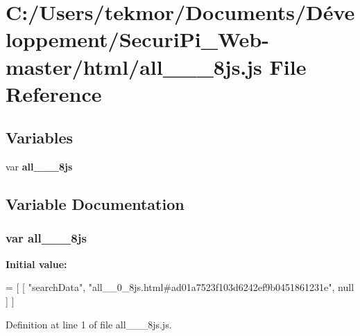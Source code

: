 \section{C\+:/\+Users/tekmor/\+Documents/\+Développement/\+Securi\+Pi\+\_\+\+Web-\/master/html/all\+\_\+\+\_\+\_\+8js.js File Reference}
\label{all____0__8js_8js}
\subsection*{Variables}
\begin{DoxyCompactItemize}
\item 
var {\bf all\+\_\+\+\_\+\_\+8js}
\end{DoxyCompactItemize}


\subsection{Variable Documentation}
\subsubsection[{all\+\_\+\+\_\+0\+\_\+8js}]{\setlength{\rightskip}{0pt plus 5cm}var all\+\_\+\+\_\+\_\+8js}\label{all____0__8js_8js_a4be3963f6ff34fb0f24882e852083ac9}
{\bfseries Initial value\+:}
\begin{DoxyCode}
=
[
    [ \textcolor{stringliteral}{"searchData"}, \textcolor{stringliteral}{"all\_\_0\_8js.html#ad01a7523f103d6242ef9b0451861231e"}, null ]
]
\end{DoxyCode}


Definition at line 1 of file all\+\_\+\+\_\+\_\+8js.\+js.

